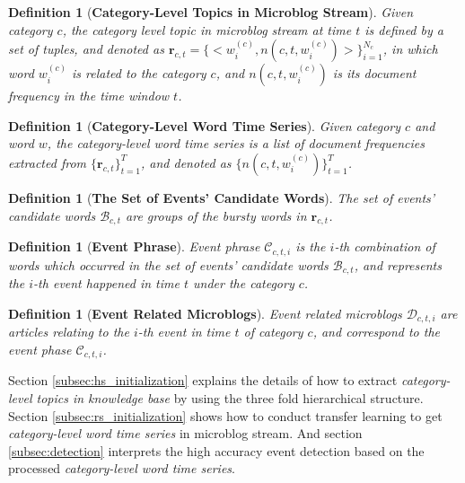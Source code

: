 \documentclass[runningheads,a4paper]{llncs}
\theoremstyle{exampstyle}
\newtheorem{rmkWithoutSpacing}[thm]{Definition}
\begin{document}
\begin{rmkWithoutSpacing}[\textbf{Category-Level Topics in Microblog Stream}] 
Given category \(c\), the category level topic in microblog stream at time \(t\) is defined by a set of tuples, and denoted as \(\bm{r}_{c,t}=\{<w^{(c)}_i,n(c,t,w^{(c)}_{i})>\}_{i=1}^{N_c}\), in which word \(w^{(c)}_{i}\) is related to the category \(c\), and \(n(c,t,w^{(c)}_{i})\) is its document frequency in the time window \(t\).
\end{rmkWithoutSpacing}

\begin{rmkWithoutSpacing}[\textbf{Category-Level Word Time Series}] 
Given category \(c\) and word \(w\), the category-level word time series is a list of document frequencies extracted from \(\{\bm{r}_{c,t}\}_{t=1}^{T}\), and denoted as \(\{n(c,t,w^{(c)}_{i})\}_{t=1}^{T}\).
\end{rmkWithoutSpacing}


\begin{rmkWithoutSpacing}[\textbf{The Set of Events' Candidate Words}] 
The set of events' candidate words \(\mathcal{B}_{c,t}\) are groups of the bursty words in \(\bm{r}_{c,t}\).
\end{rmkWithoutSpacing}

\begin{rmkWithoutSpacing}[\textbf{Event Phrase}] 
Event phrase \(\mathcal{C}_{c,t,i}\) is the \(i\)-th combination of words which occurred in the set of events' candidate words \(\mathcal{B}_{c,t}\), and represents the \(i\)-th event happened in time \(t\) under the category \(c\).
\end{rmkWithoutSpacing}

\begin{rmkWithoutSpacing}[\textbf{Event Related Microblogs}] Event related microblogs \(\mathcal{D}_{c,t,i}\) are articles relating to the \(i\)-th event in time \(t\) of category \(c\), and correspond to the event phase \(\mathcal{C}_{c,t,i}\).
\end{rmkWithoutSpacing}


Section \ref{subsec:hs_initialization} explains the details of how to extract \textit{category-level topics in knowledge base} by using the three fold hierarchical structure.
Section \ref{subsec:rs_initialization} shows how to conduct transfer learning to get \textit{category-level word time series} in microblog stream.
And section \ref{subsec:detection} interprets the high accuracy event detection based on the processed \textit{category-level word time series}.
\end{document}
